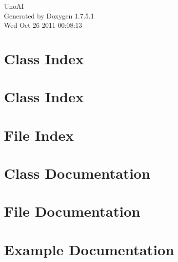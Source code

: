 \documentclass[a4paper]{book}
\begin{document}
\hypersetup{pageanchor=false,citecolor=blue}
\begin{titlepage}
\vspace*{7cm}
\begin{center}
{\Large \-Uno\-A\-I }\\
\vspace*{1cm}
{\large \-Generated by Doxygen 1.7.5.1}\\
\vspace*{0.5cm}
{\small Wed Oct 26 2011 00:08:13}\\
\end{center}
\end{titlepage}
\clearemptydoublepage
{}
\tableofcontents
\clearemptydoublepage
{}
\hypersetup{pageanchor=true,citecolor=blue}
\chapter{\-Class \-Index}

\chapter{\-Class \-Index}

\chapter{\-File \-Index}

\chapter{\-Class \-Documentation}








\chapter{\-File \-Documentation}

















\chapter{\-Example \-Documentation}

\printindex
\end{document}
